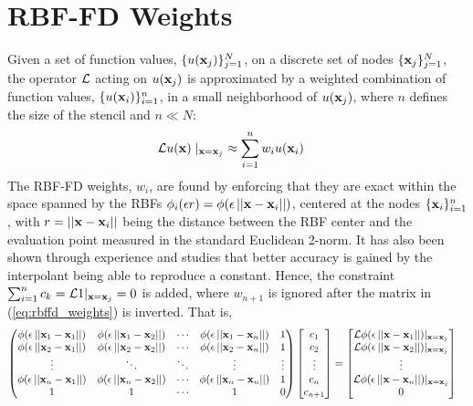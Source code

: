 \section{RBF-FD Weights} 

Given a set of function values, $\{u(\mathbf{x}_j)\}_{j=1}^{N}$, on a discrete set of nodes $\{\mathbf{x}_j\}_{j=1}^{N}$, the operator $\diffop$ acting on $u(\mathbf{x}_j)$ is approximated by a weighted combination of function values, $\{u(\mathbf{x}_i)\}_{i=1}^{n}$, in a small neighborhood of $u(\mathbf{x}_j)$, where $n$ defines the size of the stencil and $n \ll N$:
\begin{align}
\mathcal{L}u(\mathbf{x})\mid_{\mathbf{x}=\mathbf{x}_j} &\approx \sum_{i=1}^{n} w_i u(\mathbf{x}_i)
\label{eq:derivFromFDWeights}
\end{align}
The RBF-FD weights, ${w_i}$, are found by enforcing that they are exact within the space spanned by the RBFs $\phi_i(\epsilon r) = \phi(\epsilon\left|\left|\mathbf{x}-\mathbf{x}_{i}\right|\right|)$, centered at the nodes $\{\mathbf{x}_i\}_{i=1}^{n}$, with $r=\left|\left|\mathbf{x} -\mathbf{x}_i\right|\right|$ being the distance between the RBF center and the evaluation point measured in the standard Euclidean 2-norm. It has also been shown through experience and studies \cite{WrightFornberg06,FornbergDriscoll02,FornbergLehto11,FlyerLehto11} that better accuracy is gained by the interpolant being able to reproduce a constant. Hence, the constraint $\sum_{i=1}^{n}c_k=\mathcal{L}1|_{\mathbf{x}=\mathbf{x}_{j}}=0$ is added, where $w_{n+1}$ is ignored after the matrix in (\ref{eq:rbffd_weights}) is inverted. That is,
\begin{align}
\begin{pmatrix}
\phi(\epsilon\left|\left|\mathbf{x}_1-\mathbf{x}_1\right|\right|) & \phi(\epsilon\left|\left|\mathbf{x}_1-\mathbf{x}_2\right|\right|) & \cdots & \phi(\epsilon\left|\left|\mathbf{x}_1-\mathbf{x}_n\right|\right|) & 1 \\
\phi(\epsilon\left|\left|\mathbf{x}_2-\mathbf{x}_1\right|\right|) & \phi(\epsilon\left|\left|\mathbf{x}_2-\mathbf{x}_2\right|\right|) & \cdots &
\phi(\epsilon\left|\left|\mathbf{x}_2-\mathbf{x}_n\right|\right|) & 1\\
\vdots & \ddots & \ddots & \vdots & \vdots\\
\phi(\epsilon\left|\left|\mathbf{x}_n-\mathbf{x}_1\right|\right|) & \phi(\epsilon\left|\left|\mathbf{x}_n-\mathbf{x}_2\right|\right|) & \cdots &
\phi(\epsilon\left|\left|\mathbf{x}_n-\mathbf{x}_n\right|\right|) & 1 \\
1 & 1 & \cdots & 1 & 0
\end{pmatrix}
\begin{bmatrix} c_1 \\ c_2 \\ \vdots \\ c_n  \\ c_{n+1}\end{bmatrix}
&=
\begin{bmatrix} \mathcal{L}\phi(\epsilon\left|\left|\mathbf{x}-\mathbf{x}_{1}\right|\right|)|_{\mathbf{x}=\mathbf{x}_{j}} \\
               \mathcal{L}\phi(\epsilon\left|\left|\mathbf{x}-\mathbf{x}_{2}\right|\right|)|_{\mathbf{x}=\mathbf{x}_{j}} \\ \vdots \\  \mathcal{L}\phi(\epsilon\left|\left|\mathbf{x}-\mathbf{x}_{n}\right|\right|)|_{\mathbf{x}=\mathbf{x}_{j}}\\
		       0
\end{bmatrix}
\label{eq:rbffd_weights}
\end{align}	
